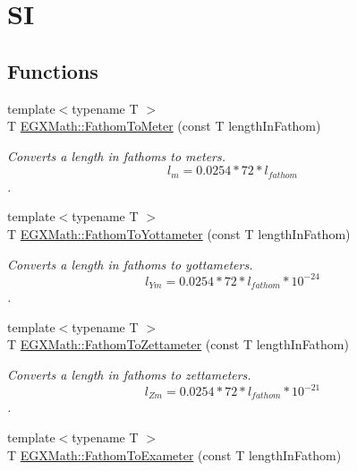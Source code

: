 \hypertarget{group___e_g_x_math-_conversions-_length_conversions-_nautical-_fathom-_s_i}{}\section{SI}
\label{group___e_g_x_math-_conversions-_length_conversions-_nautical-_fathom-_s_i}
\subsection*{Functions}
\begin{DoxyCompactItemize}
\item 
{\footnotesize template$<$typename T $>$ }\\T \mbox{\hyperlink{group___e_g_x_math-_conversions-_length_conversions-_nautical-_fathom-_s_i_ga10d9caaa366193cb8c3b086cfc47a56d}{E\+G\+X\+Math\+::\+Fathom\+To\+Meter}} (const T length\+In\+Fathom)
\begin{DoxyCompactList}\small\item\em Converts a length in fathoms to meters. \[ l_{m}=0.0254 * 72 * l_{fathom} \]. \end{DoxyCompactList}\item 
{\footnotesize template$<$typename T $>$ }\\T \mbox{\hyperlink{group___e_g_x_math-_conversions-_length_conversions-_nautical-_fathom-_s_i_ga0f5e5e4cd705f904b759f069f8926aa3}{E\+G\+X\+Math\+::\+Fathom\+To\+Yottameter}} (const T length\+In\+Fathom)
\begin{DoxyCompactList}\small\item\em Converts a length in fathoms to yottameters. \[ l_{Ym}=0.0254 * 72 * l_{fathom} * 10^{-24} \]. \end{DoxyCompactList}\item 
{\footnotesize template$<$typename T $>$ }\\T \mbox{\hyperlink{group___e_g_x_math-_conversions-_length_conversions-_nautical-_fathom-_s_i_ga3a5da531076421441774a6c7ac72bcc8}{E\+G\+X\+Math\+::\+Fathom\+To\+Zettameter}} (const T length\+In\+Fathom)
\begin{DoxyCompactList}\small\item\em Converts a length in fathoms to zettameters. \[ l_{Zm}=0.0254 * 72 * l_{fathom} * 10^{-21} \]. \end{DoxyCompactList}\item 
{\footnotesize template$<$typename T $>$ }\\T \mbox{\hyperlink{group___e_g_x_math-_conversions-_length_conversions-_nautical-_fathom-_s_i_gaf1d241e8c22ec6118c78924886dcd977}{E\+G\+X\+Math\+::\+Fathom\+To\+Exameter}} (const T length\+In\+Fathom)

\end{DoxyCompactItemize}

